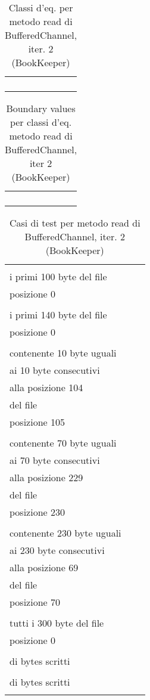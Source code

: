 \documentclass[10pt, a4paper]{article}
\newcommand{\Intmaketable}[4]{
	\begin{longtable}{#3}
	#4
	\caption{#2}
	\label{#1}
	\end{longtable}
}
\newcommand{\Intceqtable}[3]{
	\Intmaketable{#1}{#2}{|l|l|}{
	\hline
	\thead{Parametro formale} & \thead{Classi d'equivalenza} \\
	\hline
	\hline
	#3
	\hline}
}
\newcommand{\Intbvtable}[3]{
	\Intmaketable{#1}{#2}{|l|l|l|}{
	\hline
	\thead{Parametro formale} & \thead{Classe d'equivalenza} & \thead{Boundary value}\\
	\hline
	\hline
	#3
	\hline}
}
\newcommand{\Inttestctable}[3]{
	\Intmaketable{#1}{#2}{|l|l|l|}{
	\hline
	\thead{Input} & \thead{Esito atteso} & \thead{Motivazione}\\
	\hline
	\hline
	#3
	\hline}
}
\newcommand{\Intceqcaption}[4]{Classi d'eq. per metodo #1 di #2, iter. #3 (#4)}
\newcommand{\Intbvcaption}[4]{Boundary values per classi d'eq. metodo #1 di #2, iter #3 (#4)}
\newcommand{\Inttestccaption}[4]{Casi di test per metodo #1 di #2, iter. #3 (#4)}
\newcommand{\gettablelabel}[5]{table:#1:#2:#3:iter#4:proj#5}
\newcommand{\ceqtable}[5]{
	\Intceqtable{\gettablelabel{ceq}{#1}{#2}{#3}{#4}}
		{\Intceqcaption{#1}{#2}{#3}{#4}}
		{#5}
}
\newcommand{\bvtable}[5]{
	\Intbvtable{\gettablelabel{bv}{#1}{#2}{#3}{#4}}
		{\Intbvcaption{#1}{#2}{#3}{#4}}
		{#5}
}
\newcommand{\testctable}[5]{
	\Inttestctable{\gettablelabel{testc}{#1}{#2}{#3}{#4}}
		{\Inttestccaption{#1}{#2}{#3}{#4}}
		{#5}
}
\newcommand{\tcell}{\makecell[tl]}
\newcommand{\newtrow}{\\ \hline}
\def\bookkeeper{BookKeeper}
\newcommand{\ceq}[1]{\{#1\}}
\begin{document}
	\ceqtable{read}{BufferedChannel}{2}{\bookkeeper}{
			\tcell{dest} & \tcell{\ceq{buffer di destinazione vuoto}}
		\newtrow
			\tcell{pos} & \tcell{\ceq{$\ge 0$}}
		\newtrow
			\tcell{length} & \tcell{\ceq{$\ge 1$}}
		\newtrow
	}
	
	\bvtable{read}{BufferedChannel}{2}{\bookkeeper}{
			\tcell{dest} & \tcell{\ceq{buffer di destinazione vuoto}} & \tcell{ByteBuf()}
		\newtrow
			\tcell{pos} & \tcell{\ceq{$\ge 0$}} & \tcell{$0$}
		\newtrow
			\tcell{length} & \tcell{\ceq{$\ge 1$}} & \tcell{1}
		\newtrow
	}
	
	\testctable{read}{BufferedChannel}{2}{\bookkeeper}{
			\tcell{ByteBuf(), 0, 100} &
			\tcell{Buffer destinazione contenente\\
					i primi 100 byte del file} &
			\tcell{Lettura di 100 byte dalla\\posizione 0}
		\newtrow
			\tcell{ByteBuf(), 0, 140} &
			\tcell{Buffer destinazione contenente\\
					i primi 140 byte del file} &
			\tcell{Lettura di 140 byte dalla\\posizione 0}
		\newtrow
			\tcell{ByteBuf(), 105, 10} & 
			\tcell{Buffer destinazione\\ 
				contenente 10 byte uguali\\ 
				ai 10 byte consecutivi\\
				alla posizione 104\\ 
				del file} &
			\tcell{Lettura di 10 byte dalla\\posizione 105}
		\newtrow
			\tcell{ByteBuf(), 230, 70} & 
			\tcell{Buffer destinazione\\ 
				contenente 70 byte uguali\\ 
				ai 70 byte consecutivi\\
				alla posizione 229\\ 
				del file} &
			\tcell{Lettura di 70 byte dalla\\posizione 230}
		\newtrow
			\tcell{ByteBuf(), 70, 230} & 
			\tcell{Buffer destinazione\\ 
				contenente 230 byte uguali\\ 
				ai 230 byte consecutivi\\
				alla posizione 69\\ 
				del file} &
			\tcell{Lettura di 230 byte dalla\\posizione 70}
		\newtrow
			\tcell{ByteBuf(), 0, 300} &
			\tcell{Buffer destinazione contenente\\
					tutti i 300 byte del file} &
			\tcell{Lettura di 300 byte dalla\\posizione 0}
		\newtrow
			\tcell{ByteBuf(), 0, 301} &
			\tcell{IOException viene lanciata} &
			\tcell{
					La lettura eccede il numero\\
					di bytes scritti}
		\newtrow
			\tcell{ByteBuf(), 300, 1} &
			\tcell{IOException viene lanciata} &
			\tcell{
					La lettura eccede il numero\\
					di bytes scritti}
		\newtrow
	}
	
\end{document}
